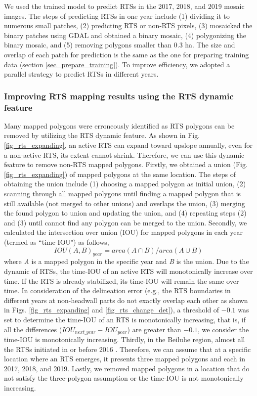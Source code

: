 \documentclass[authoryear,preprint,review,12pt]{elsarticle}
\begin{document}
We used the trained model to predict RTSs in the 2017, 2018, and 2019 mosaic images. 
The steps of predicting RTSs in one year include (1) dividing it to numerous small patches, 
(2) predicting RTS or non-RTS pixels, 
(3) mosaicked the binary patches using GDAL and obtained a binary mosaic, 
(4) polygonizing the binary mosaic, and 
(5) removing polygons smaller than 0.3 ha. 
The size and overlap of each patch for prediction is the same as the one for preparing training data (section \ref{sec_prepare_training}). 
To improve efficiency, we adopted a parallel strategy to predict RTSs in different years.


\subsubsection{Improving RTS mapping results using the RTS dynamic feature}
\label{sec_improving_using_rts_dynamic}

Many mapped polygons were erroneously identified as RTS polygons can be removed by utilizing the RTS dynamic feature. 
As shown in Fig. \ref{fig_rts_expanding}, an active RTS can expand toward upslope annually, even for a non-active RTS, its extent cannot shrink. 
Therefore, we can use this dynamic feature to remove non-RTS mapped polygons. 
Firstly, we obtained a union (Fig. \ref{fig_rts_expanding}) of mapped polygons at the same location.
The steps of obtaining the union include (1) choosing a mapped polygon as initial union, (2) scanning through all mapped polygons until finding a mapped polygon that is still available (not merged to other unions) and overlaps the union, (3) merging the found polygon to union and updating the union, and (4) repeating steps (2) and (3) until cannot find any polygon can be merged to the union. 
Secondly, we calculated the intersection over union (IOU) for mapped polygons in each year (termed as ``time-IOU") as follows, 
\begin{equation}
IOU(A,B)_{year}=area(A \cap B)/area(A \cup B)
\label{equ_time_iou}
\end{equation}
where \emph{A} is a mapped polygon in the specific year and \emph{B} is the union. 
Due to the dynamic of RTSs, the time-IOU of an active RTS will monotonically increase over time. 
If the RTS is already stabilized, its time-IOU will remain the same over time. 
In consideration of the delineation error (e.g., the RTS boundaries in different years at non-headwall parts do not exactly overlap each other as shown in Figs. \ref{fig_rts_expanding} and \ref{fig_rts_change_det}), a threshold of $-0.1$ was set to determine the time-IOU of an RTS is monotonically increasing, that is, if all the differences ($IOU_{next\_year}-IOU_{year}$) are greater than $-0.1$, we consider the time-IOU is monotonically increasing. 
Thirdly, in the Beiluhe region, almost all the RTSs initiated in or before 2016 \citep{luo2019recent}.
Therefore, we can assume that at a specific location where an RTS emerges, it presents three mapped polygons and each in 2017, 2018, and 2019. 
Lastly, we removed mapped polygons in a location that do not satisfy the three-polygon assumption or the time-IOU is not monotonically increasing.
 
\end{document}
